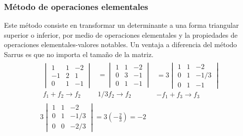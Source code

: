 \subsubsection*{Método de operaciones elementales}
Este método consiste en transformar un determinante a una forma triangular superior o inferior, por medio de operaciones elementales y la propiedades de operaciones elementales-valores notables.
Un ventaja a diferencia del método Sarrus es que no importa el tamaño de la matriz.
\begin{align*}
	&\begin{array} {c}
		\begin{vmatrix}
			1&1&-2\\
			-1&2&1\\
			0&1&-1
		\end{vmatrix}\\
		f_1+f_2\rightarrow f_2
	\end{array}\begin{array} {c}
	=\begin{vmatrix}
		1&1&-2\\
		0&3&-1\\
		0&1&-1
	\end{vmatrix}\\
		1/3f_2\rightarrow f_2
	\end{array}	\begin{array} {c}
	=3\begin{vmatrix}
		1&1&-2\\
		0&1&-1/3\\
		0&1&-1
	\end{vmatrix}\\
		-f_1+f_3\rightarrow f_3
	\end{array}\\
	&3\begin{vmatrix}
		1&1&-2\\
		0&1&-1/3\\
		0&0&-2/3
	\end{vmatrix}=3\left(-\frac{2}{3}\right)=-2
\end{align*}